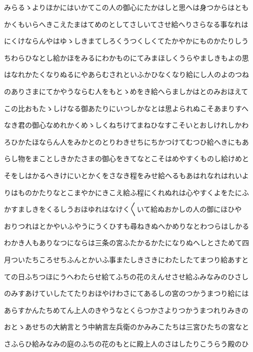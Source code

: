 \documentclass[a4paper,11pt,landscape]{ltjtarticle}
\begin{document}
\par\medskip
みらるゝよりほかにはいかてこの人の御心にたかはしと思へは身つからはとも
\par\medskip
かくもいらへきこえたまはてめのとしてさしいてさせ給へりさらなる事なれは
\par\medskip
にくけならんやはゆゝしきまてしろくうつくしくてたかやかにものかたりしう
\par\medskip
ちわらひなとし給かほをみるにわかものにてみまほしくうらやましきもよの思
\par\medskip
はなれかたくなりぬるにやあらむされといふかひなくなり給にし人のよのつね
\par\medskip
のありさまにてかやうならむ人をもとゝめをき給へらましかはとのみおほえて
\par\medskip
この比おもたゝしけなる御あたりにいつしかなとは思よられぬこそあまりすへ
\par\medskip
なき君の御心なめれかくめゝしくねちけてまねひなすこそいとおしけれしかわ
\par\medskip
ろひかたほならん人をみかとのとりわきせちにちかつけてむつひ給へきにもあ
\par\medskip
らし物をまことしきかたさまの御心をきてなとこそはめやすくものし給けめと
\par\medskip
そをしはかるへきけにいとかくをさなき程をみせ給へるもあはれなれはれいよ
\par\medskip
りはものかたりなとこまやかにきこえ給ふ程にくれぬれは心やすくよをたにふ
\par\medskip
かすましきをくるしうおほゆれはなけく〱いて給ぬおかしの人の御にほひや
\par\medskip
おりつれはとかやいふやうにうくひすも尋ねきぬへかめりなとわつらはしかる
\par\medskip
わかき人もありなつにならは三条の宮ふたかるかたになりぬへしとさためて四
\par\medskip
月ついたちころせちふんとかいふ事またしきさきにわたしたてまつり給あすと
\par\medskip
ての日ふちつほにうへわたらせ給てふちの花のえんせさせ給ふみなみのひさし
\par\medskip
のみすあけていしたてたりおほやけわさにてあるしの宮のつかうまつり給には
\par\medskip
あらすかんたちめてん上人のきやうなとくらつかさよりつかうまつれりみきの
\par\medskip
おとゝあせちの大納言とう中納言左兵衛のかみみこたちは三宮ひたちの宮なと
\par\medskip
さふらひ給みなみの庭のふちの花のもとに殿上人のさはしたりこうらう殿のひ
\end{document}
